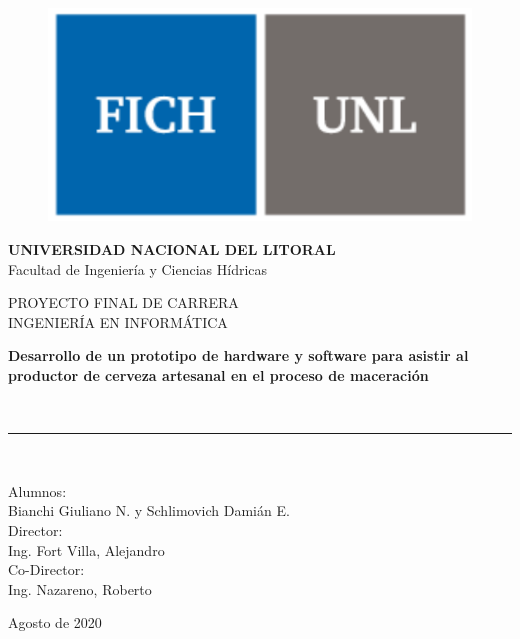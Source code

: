 \begin{titlepage}
	\cleardoublepage
	\frontmatter
	\begin{center}
		\begin{figure}
			\centerline{\includegraphics[scale=0.75]{fichunl.pdf}}
			\label{logo}
		\end{figure}
		\begin{Large}
			\textbf{UNIVERSIDAD NACIONAL DEL LITORAL} \\
			Facultad de Ingeniería y Ciencias Hídricas\\
			\vspace*{1cm}
		\end{Large}
		\vspace*{0.5cm}
		PROYECTO FINAL DE CARRERA\\
		INGENIERÍA EN INFORMÁTICA\\
		\vspace*{1.5cm}
		\begin{Large}
			\textbf{Desarrollo de un prototipo de hardware y software para asistir al productor de cerveza artesanal en el proceso de maceración}
		\end{Large}
		\\
		\vspace*{1cm}
		\rule{100mm}{0.1mm}\\
		\vspace*{1.5cm}
		\begin{large}
			Alumnos: \\
			Bianchi Giuliano N. y Schlimovich Damián E.\\
			\vspace*{0.5cm}
			Director: \\
			Ing. Fort Villa, Alejandro   \\
			\vspace*{0.5cm}
			Co-Director: \\
			Ing. Nazareno, Roberto\\
		\end{large}
		\vspace*{2.5cm}
		\begin{center}
			Agosto de 2020\textsl{}
		\end{center}
	\end{center}
\end{titlepage}